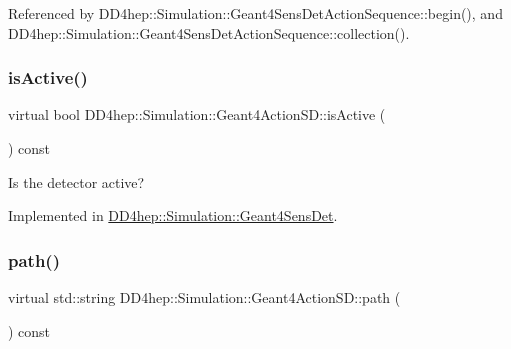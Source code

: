 Referenced by D\+D4hep\+::\+Simulation\+::\+Geant4\+Sens\+Det\+Action\+Sequence\+::begin(), and D\+D4hep\+::\+Simulation\+::\+Geant4\+Sens\+Det\+Action\+Sequence\+::collection().

\hypertarget{class_d_d4hep_1_1_simulation_1_1_geant4_action_s_d_a2c3791fc610294f1d3fc9ff6fe0e755f}{}\label{class_d_d4hep_1_1_simulation_1_1_geant4_action_s_d_a2c3791fc610294f1d3fc9ff6fe0e755f} 
\subsubsection{\texorpdfstring{is\+Active()}{isActive()}}
{\footnotesize\ttfamily virtual bool D\+D4hep\+::\+Simulation\+::\+Geant4\+Action\+S\+D\+::is\+Active (\begin{DoxyParamCaption}{ }\end{DoxyParamCaption}) const\hspace{0.3cm}{\ttfamily [pure virtual]}}



Is the detector active? 



Implemented in \hyperlink{class_d_d4hep_1_1_simulation_1_1_geant4_sens_det_a317a03e948f5b1cace52ed1ec8600292}{D\+D4hep\+::\+Simulation\+::\+Geant4\+Sens\+Det}.

\hypertarget{class_d_d4hep_1_1_simulation_1_1_geant4_action_s_d_a8d3333538a535ac963931173f15acfeb}{}\label{class_d_d4hep_1_1_simulation_1_1_geant4_action_s_d_a8d3333538a535ac963931173f15acfeb} 
\subsubsection{\texorpdfstring{path()}{path()}}
{\footnotesize\ttfamily virtual std\+::string D\+D4hep\+::\+Simulation\+::\+Geant4\+Action\+S\+D\+::path (\begin{DoxyParamCaption}{ }\end{DoxyParamCaption}) const\hspace{0.3cm}{\ttfamily [pure virtual]}}



